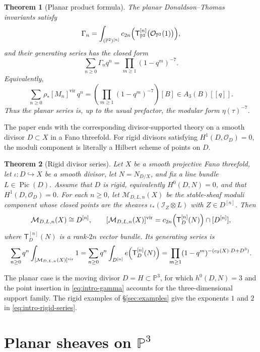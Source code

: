 \documentclass[12pt]{amsart}
\numberwithin{equation}{section}
\newcommand{\PP}{\mathbb{P}}
\newcommand{\OO}{\mathcal{O}}
\newcommand{\I}{\mathcal{I}}
\newcommand{\M}{\mathcal{M}}
\newcommand{\Pic}{\operatorname{Pic}}
\newcommand{\Ttw}{\mathsf{T}}
\newcommand{\vfc}[1]{[#1]^{\mathrm{vir}}}
\theoremstyle{plain}
\newtheorem{theorem}{Theorem}[section]
\theoremstyle{definition}
\theoremstyle{remark}
\begin{document}
\begin{theorem}[Planar product formula]\label{thm:C}
The planar Donaldson--Thomas invariants satisfy
\[
\Gamma_n=\int_{(\PP^2)^{[n]}} c_{2n}\Bigl(\Ttw_{\PP^2}^{[n]}\bigl(\OO_{\PP^2}(1)\bigr)\Bigr),
\]
and their generating series has the closed form
\begin{equation}\label{eq:intro-planar-series}
\sum_{n\ge 0}\Gamma_nq^n=\prod_{m\ge 1}(1-q^m)^{-7}.
\end{equation}
Equivalently,
\[
\sum_{n\ge 0}\rho_*\vfc{M_n}\,q^n=
\left(\prod_{m\ge 1}(1-q^m)^{-7}\right)[B]
\in A_3(B)[[q]].
\]
Thus the planar series is, up to the usual prefactor, the modular form $\eta(\tau)^{-7}$.
\end{theorem}

The paper ends with the corresponding divisor-supported theory on a smooth divisor $D\subset X$ in a Fano threefold.
For rigid divisors satisfying $H^1(D,\OO_D)=0$, the moduli component is literally a Hilbert scheme of points on $D$.

\begin{theorem}[Rigid divisor series]\label{thm:D}
Let $X$ be a smooth projective Fano threefold, let $\iota\colon D\hookrightarrow X$ be a smooth divisor, let $N=N_{D/X}$, and fix a line bundle $L\in\Pic(D)$.
Assume that $D$ is rigid, equivalently $H^0(D,N)=0$, and that $H^1(D,\OO_D)=0$.
For each $n\ge 0$, let $\M_{D,L,n}(X)$ be the stable-sheaf moduli component whose closed points are the sheaves $\iota_*(\I_Z\otimes L)$ with $Z\in D^{[n]}$.
Then
\[
\M_{D,L,n}(X)\cong D^{[n]},
\qquad
\vfc{\M_{D,L,n}(X)}=c_{2n}\Bigl(\Ttw_D^{[n]}(N)\Bigr)\cap [D^{[n]}],
\]
where $\Ttw_D^{[n]}(N)$ is a rank-$2n$ vector bundle.
Its generating series is
\begin{equation}\label{eq:intro-rigid-series}
\sum_{n\ge 0}q^n\int_{\vfc{\M_{D,L,n}(X)}}1
=
\sum_{n\ge 0}q^n\int_{D^{[n]}}e\Bigl(\Ttw_D^{[n]}(N)\Bigr)
=
\prod_{m\ge 1}(1-q^m)^{-(c_2(X)\cdot D+D^3)}.
\end{equation}
\end{theorem}

The planar case is the moving divisor $D=H\subset \PP^3$, for which $h^0(D,N)=3$ and the point insertion in \eqref{eq:intro-gamma} accounts for the three-dimensional support family.
The rigid examples of \S\ref{sec:examples} give the exponents $1$ and $2$ in \eqref{eq:intro-rigid-series}.

\section{Planar sheaves on $\PP^3$}\label{sec:planar}
\end{document}
